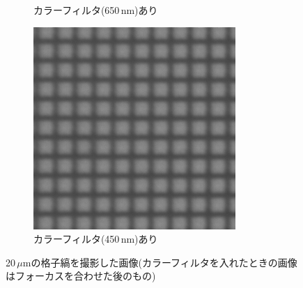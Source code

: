 \documentclass[titlepage]{jsarticle}
\begin{document}
\begin{figure}[htbp]
\begin{subfigure}{0.3\columnwidth}
        \caption{カラーフィルタ(650\,nm)あり}
        \label{fig:20red}
    \end{subfigure}
    \begin{subfigure}{0.3\columnwidth}
        \centering
        \includegraphics[width=\columnwidth]{20um_blue2_tri.png}
        \caption{カラーフィルタ(450\,nm)あり}
        \label{fig:20blue}
    \end{subfigure}    
    \caption{20\,$\mu$mの格子縞を撮影した画像(カラーフィルタを入れたときの画像はフォーカスを合わせた後のもの)}
    \label{fig:20}
\end{figure}
\end{document}
